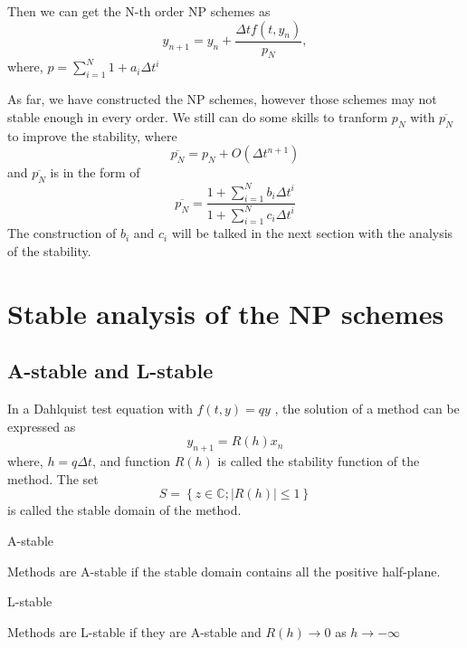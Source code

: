 \documentclass[review]{elsarticle}
\theoremstyle{plain}\newtheorem{definition}{\sc{Definition}}
\theoremstyle{defination}\newtheorem{example}{Example}[section]
\numberwithin{equation}{section}
\numberwithin{table}{section}
\begin{document}
{Then we can get the N-th order NP schemes as 
\begin{equation}
  y_{n+1}=y_n+\frac{\Delta tf(t,y_n)}{p_N},
  \end{equation}
  where, $p=\sum_{i=1}^N 1+a_i \Delta t^i$


  As far, we have constructed the NP schemes, however those schemes may not stable enough in every order. We still can do some skills to tranform $p_N$ with $\overline{p_N}$ to improve the stability, where
\begin{equation}
  \overline{p_N}= p_N+O(\Delta t^{n+1})
  \end{equation}
  and $\overline{p_N}$ is in the form of 
\begin{equation}
  \overline{p_N}= \frac{1+\sum_{i=1}^N b_i \Delta t^i}{1+\sum_{i=1}^N c_i\Delta t^i} 
  \end{equation}
  The construction of $b_i$ and $c_i$ will be talked in  the next section with the analysis of the stability. 
  \section{Stable analysis of the NP schemes}  

  \subsection{A-stable and L-stable}
 In a Dahlquist test equation with $f(t,y)=qy$ , the solution of a method can be expressed as
 \begin{equation}
   y_{n+1} = R(h)x_n
   \end{equation}
   where, $h=q\Delta t$, and function $R(h)$ is called the stability function of the method. The set 
   \begin{equation}
	 S = \left\{ z\in \mathbb{C}; |R(h)| \le 1\right\}
	 \end{equation}
	 is called the stable domain of the method.

	  \hspace{0.2cm}  \hspace{0.3cm} A-stable 

	 Methods are A-stable if the stable domain contains all the positive half-plane. 


	  \hspace{0.2cm}  \hspace{0.3cm} L-stable 

	  Methods are L-stable if they are A-stable and $R(h)\rightarrow 0$ as $h\rightarrow -\infty$

}
\end{document}
